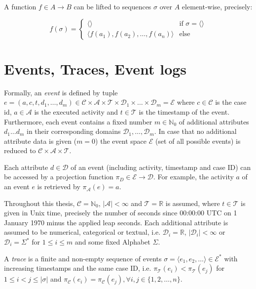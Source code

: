 A function $f \in A \rightarrow B$ can be lifted to sequences $\sigma$ over $A$ element-wise, precisely:

	\[
	f(\sigma) =
	\begin{cases}
	\langle \rangle & \text{if $\sigma = \langle \rangle$} \\
	\langle f(a_1), f(a_2), \dots, f(a_n)\rangle & \text{else} 
	\end{cases}
	\]


\section{Events, Traces, Event logs}

\begin{definition}
Formally, an  \textit{event} is defined by tuple $e = (a,c,t,d_1,\dots, d_m) \in \mathcal{C} \times \mathcal{A}  \times \mathcal{T} \times \mathcal{D}_1 \times \dots \times \mathcal{D}_m =  \mathcal{E}$ where  $c \in \mathcal{C} $ is the case id, $a \in \mathcal{A}$ is the executed activity and $t \in \mathcal{T}$ is the timestamp of the event.
Furthermore, each event contains a fixed number $m \in \mathbb{N}_0$ of additional attributes $d_1 \dots d_m$ in their corresponding domains $\mathcal{D}_1, \dots , \mathcal{D}_m$.
In case that no additional attribute data is given ($m = 0$) the event space $\mathcal{E}$ (set of all possible events) is reduced to $\mathcal{C} \times \mathcal{A}  \times \mathcal{T}$.
\end{definition}

Each attribute $d \in \mathcal{D}$ of an event (including activity, timestamp and case ID) can be accessed by a projection function $\pi_D \in \mathcal{E} \rightarrow \mathcal{D}$.
For example, the activity $a$ of an event $e$ is retrieved by $\pi_\mathcal{A}(e) = a$.

Throughout this thesis,  $\mathcal{C} = \mathbb{N}_0$, $|\mathcal{A}| < \infty$ and $ \mathcal{T} = \mathbb{R}$ is assumed, where $t \in \mathcal{T}$ is given in Unix time, precisely the number of seconds since 00:00:00 UTC on 1 January 1970 minus the applied leap seconds.
Each additional attribute is assumed to be numerical, categorical or textual, i.e. $\mathcal{D}_i = \mathbb{R}$, $|\mathcal{D}_i| < \infty$ or $\mathcal{D}_i = \Sigma^\ast$  for $1 \leq i \leq m$ and some fixed Alphabet $\Sigma$.

\begin{definition}
	A \textit{trace} is a finite and non-empty sequence of events $\sigma = \langle e_1, e_2, \dots\rangle \in  \mathcal{E}^\ast$ with increasing timestamps and the same case ID, i.e. $\pi_\mathcal{T} (e_i) < \pi_\mathcal{T} (e_j) $ for $1 \leq i < j \leq |\sigma|$ and $\pi_\mathcal{C} (e_i) = \pi_\mathcal{C} (e_j), \forall i,j \in \{1, 2, \dots, n\}$.
\end{definition}

